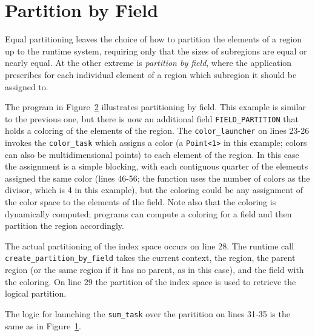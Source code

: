 \begin{figure}
  
  \caption{}
  \label{fig:equalpart}
\end{figure}


\section{Partition by Field}
\label{sec:pbf}

Equal partitioning leaves the choice of how to partition the elements of a region
up to the runtime system, requiring only that the sizes of subregions are
equal or nearly equal.  At the other extreme is {\em partition by field}, where
the application prescribes for each individual element of a region which subregion it should be assigned to.

The program in Figure~\ref{fig:pbf} illustrates partitioning by field.  This example is similar to the previous one,
but there is now an additional field {\tt FIELD\_PARTITION} that holds a coloring of the elements of the region.
The {\tt color\_launcher} on lines 23-26 invokes the {\tt color\_task} which assigns a color (a {\tt Point<1>} in this example; colors can also be multidimensional points) to each
element of the region.  In this case the assignment is a simple blocking, with each contiguous quarter of the elements assigned the same
color (lines 46-56; the function uses the number of colors as the divisor, which is 4 in this example), but the coloring could be any assignment of the color space to the elements of the field.  Note also that the
coloring is dynamically computed; programs can compute a coloring for a field and then partition the region accordingly.

The actual partitioning of the index space occurs on line 28.  The runtime call {\tt create\_partition\_by\_field} takes the current
context, the region, the parent region (or the same region if it has no parent, as in this case), and the field with the coloring.
On line 29 the partition of the index space is used to retrieve the logical partition.

The logic for launching the {\tt sum\_task} over the paritition on lines 31-35 is the same as in Figure~\ref{fig:equalpart}.

\begin{figure}
  
  \caption{}
  \label{fig:pbf}
\end{figure}

